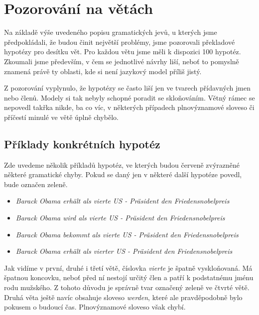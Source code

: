 \documentclass[12pt,a4paper]{report}
\begin{document}
\section{Pozorování na větách}
Na základě výše uvedeného popisu gramatických jevů, u kterých jsme předpokládali, že budou činit největší problémy, jsme pozorovali překladové hypotézy pro desítku vět. Pro každou větu jsme měli k dispozici 100 hypotéz. Zkoumali jsme především, v čem se jednotlivé návrhy liší, neboť to pomyslně znamená právě ty oblasti, kde si není jazykový model příliš jistý.

Z pozorování vyplynulo, že hypotézy se často liší jen ve tvarech přídavných jmen nebo členů. Modely si tak nebyly schopné poradit se skloňováním. Větný rámec se nepovedl takřka nikde, ba co víc, v některých případech plnovýznamové sloveso či příčestí minulé ve větě úplně chybělo.

\subsection{Příklady konkrétních hypotéz}

Zde uvedeme několik příkladů hypotéz, ve kterých budou {\color{red}červeně} zvýrazněné některé gramatické chyby. Pokud se daný jen v některé další hypotéze povedl, bude označen {\color{OliveGreen}zeleně}.

\begin{itemize}
\item{\textit{Barack Obama erhält als {\color{red}vierte US - Präsident} den Friedensnobelpreis}}
\item{\textit{Barack Obama {\color{red}wird} als {\color{red}vierte US - Präsident} den Friedensnobelpreis}}
\item{\textit{Barack Obama bekommt als {\color{red}vierte US - Präsident} den Friedensnobelpreis}}
\item{\textit{Barack Obama erhält als {\color{OliveGreen}vierter US - Präsident} den Friedensnobelpreis}}
\end{itemize}

Jak vidíme v první, druhé i třetí větě, číslovka \textit{vierte} je špatně vyskloňovaná. Má špatnou koncovku, neboť před ní nestojí určitý člen a patří k podstatnému jménu rodu mužského. Z tohoto důvodu je správně tvar označený zeleně ve čtvrté větě. Druhá věta ještě navíc obsahuje sloveso \textit{werden}, které ale pravděpodobně bylo pokusem o budoucí čas. Plnovýznamové sloveso však chybí.
\end{document}
